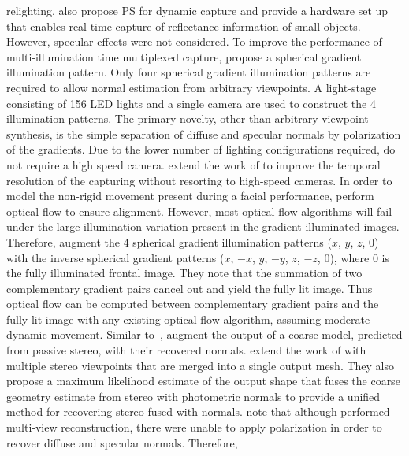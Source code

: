 relighting.
\citet{malzbender2006surface} also propose PS for dynamic
capture and provide a hardware set up that enables real-time capture
of reflectance information of small objects. However, specular effects
were not considered.
To improve the performance of multi-illumination time multiplexed
capture, \citet{ma2007rapid} propose a spherical gradient illumination pattern.
Only four spherical gradient illumination patterns are required to allow
normal estimation from arbitrary viewpoints. A light-stage consisting of 156
LED lights and a single camera are used to construct the 4 illumination
patterns. The primary novelty, other than arbitrary viewpoint synthesis, is
the simple separation of diffuse and specular normals by polarization of the
gradients. Due to the lower number of lighting configurations required,
\citet{ma2007rapid} do not require a high speed camera.
\citet{wilson2010temporal} extend the work of \citet{ma2007rapid} to
improve the temporal resolution of the capturing without resorting to
high-speed cameras. In order to model the non-rigid movement present
during a facial performance, \citet{wilson2010temporal} perform optical
flow to ensure alignment. However, most optical flow algorithms will fail under
the large illumination variation present in the gradient illuminated images.
Therefore, \citet{wilson2010temporal} augment the 4 spherical gradient
illumination patterns ($x$, $y$, $z$, $0$) with the inverse spherical
gradient patterns ($x$, $-x$, $y$, $-y$, $z$, $-z$, $0$), where $0$ is the
fully illuminated frontal image. They note that the summation of two
complementary gradient pairs cancel out and yield the fully lit image. Thus
optical flow can be computed between complementary gradient pairs and the fully
lit image with any existing optical flow algorithm, assuming moderate dynamic
movement. Similar to~\cite{ma2007rapid,debevec2000acquiring,weyrich2006analysis},
\citet{wilson2010temporal} augment the output of a coarse model, predicted
from passive stereo, with their recovered normals.
\citet{fyffe2011comprehensive} extend the work of \citet{wilson2010temporal}
with multiple stereo viewpoints that are merged into a single output mesh.
They also propose a maximum likelihood estimate of the output shape
that fuses the coarse geometry estimate from stereo with photometric normals
to provide a unified method for recovering stereo fused with normals.
\citet{ghosh2011multiview} note that although \citet{fyffe2011comprehensive}
performed multi-view reconstruction, there were unable to apply polarization
in order to recover diffuse and specular normals. Therefore,
